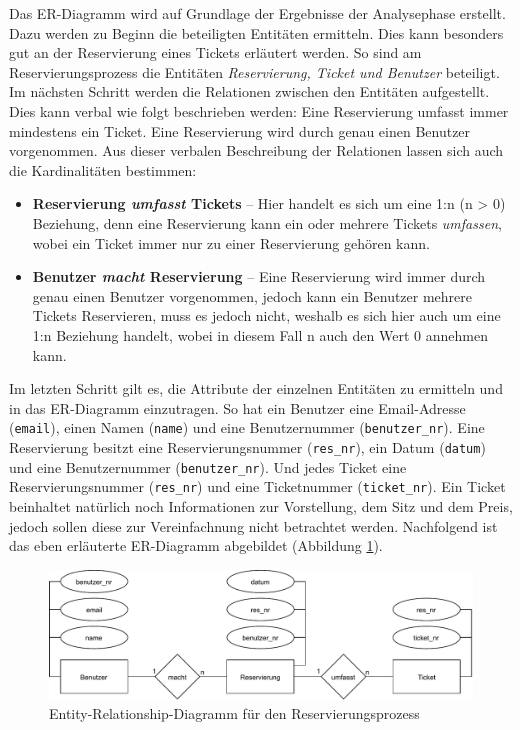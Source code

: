 		Das ER-Diagramm wird auf Grundlage der Ergebnisse der Analysephase erstellt. Dazu werden zu Beginn die beteiligten Entitäten ermitteln. Dies kann besonders gut an der Reservierung eines Tickets erläutert werden. So sind am Reservierungsprozess die Entitäten \textit{Reservierung, Ticket und Benutzer} beteiligt. Im nächsten Schritt werden die Relationen zwischen den Entitäten aufgestellt. Dies kann verbal wie folgt beschrieben werden: Eine Reservierung umfasst immer mindestens ein Ticket. Eine Reservierung wird durch genau einen Benutzer vorgenommen. Aus dieser verbalen Beschreibung der Relationen lassen sich auch die Kardinalitäten bestimmen:
		\begin{itemize}
			\item \textbf{Reservierung \textit{umfasst} Tickets} -- Hier handelt es sich um eine 1:n (n > 0) Beziehung, denn eine Reservierung kann ein oder mehrere Tickets \textit{umfassen}, wobei ein Ticket immer nur zu einer Reservierung gehören kann.
			
			\item  \textbf{Benutzer \textit{macht} Reservierung} -- Eine Reservierung wird immer durch genau einen Benutzer vorgenommen, jedoch kann ein Benutzer mehrere Tickets Reservieren, muss es jedoch nicht, weshalb es sich hier auch um eine 1:n Beziehung handelt, wobei in diesem Fall n auch den Wert 0 annehmen kann. 
		\end{itemize}
		Im letzten Schritt gilt es, die Attribute der einzelnen Entitäten zu ermitteln und in das ER-Diagramm einzutragen. So hat ein Benutzer eine Email-Adresse (\texttt{email}), einen Namen (\texttt{name}) und eine Benutzernummer (\texttt{benutzer\_nr}). Eine Reservierung besitzt eine Reservierungsnummer (\texttt{res\_nr}), ein Datum (\texttt{datum}) und eine Benutzernummer (\texttt{benutzer\_nr}). Und jedes Ticket eine Reservierungsnummer (\texttt{res\_nr}) und eine Ticketnummer (\texttt{ticket\_nr}). Ein Ticket beinhaltet natürlich noch Informationen zur Vorstellung, dem Sitz und dem Preis, jedoch sollen diese zur Vereinfachnung nicht betrachtet werden. Nachfolgend ist das eben erläuterte ER-Diagramm abgebildet (Abbildung \ref{fig:erdiagramm_reservation}).
		
		\begin{figure}[H]
			\centering 
			\includegraphics[width=13cm]{img/erdiagramm_reservation.pdf}
			\captionsetup{format=hang}
			\caption[ER-Datenmodell Reservierungsprozess]{\label{fig:erdiagramm_reservation} Entity-Relationship-Diagramm für den Reservierungsprozess}
		\end{figure}
		
